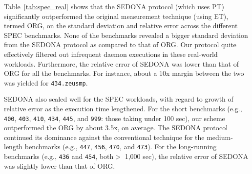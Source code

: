\documentclass[letter]{ieice}
\begin{document}
Table~\ref{tab:spec_real} shows that
the SEDONA protocol (which uses PT) significantly outperformed the original 
measurement technique (using ET), termed ORG, 
on the standard deviation and relative error across the different SPEC benchmarks. 
None of the benchmarks revealed a bigger standard deviation from the SEDONA protocol as compared to that of ORG. 
Our protocol quite effectively filtered out infrequent daemon executions 
in these real-world workloads. 
Furthermore, the relative error of SEDONA was 
lower than that of ORG for all the benchmarks. 
For instance, about a 10x \hbox{margin} between the two was yielded for 
{\tt 434.zeusmp}.

SEDONA also scaled well for the SPEC workloads, 
with regard to growth of relative error as the execution time lengthened.
For the short benchmarks 
(e.g., {\tt 400}, {\tt 403}, {\tt 410}, 
{\tt 434}, {\tt 445}, and {\tt 999}: those taking \hbox{under} 100 sec), 
our scheme outperformed the ORG by about 3.5x, on average. 
The SEDONA protocol continued its dominance against the conventional technique 
for the medium-length benchmarks (e.g., {\tt 447}, {\tt 456}, {\tt 470}, and {\tt 473}).
For the long-running benchmarks (e.g., {\tt 436} and {\tt 454}, both$>$ 1,000 sec), 
the relative error of \hbox{SEDONA} was slightly lower than that of ORG.

 
\end{document}
